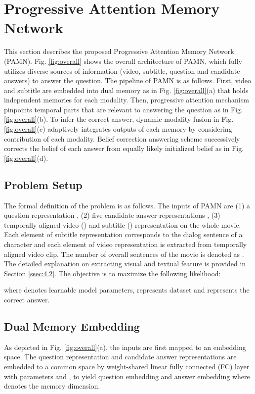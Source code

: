 \documentclass[10pt,twocolumn,letterpaper]{article}
\begin{document}
\section{Progressive Attention Memory Network}
\label{sec:3}

This section describes the proposed Progressive Attention Memory Network (PAMN). Fig. \ref{fig:overall} shows the overall architecture of PAMN,  which fully utilizes diverse sources of information (video, subtitle, question and candidate answers) to answer the question. The pipeline of PAMN is as follows. First, video and subtitle are embedded into dual memory as in Fig. \ref{fig:overall}(a) that holds independent memories for each modality. Then, progressive attention mechanism pinpoints temporal parts that are relevant to answering the question as in Fig. \ref{fig:overall}(b). To infer the correct answer, dynamic modality fusion in Fig. \ref{fig:overall}(c) adaptively integrates outputs of each memory by considering contribution of each modality. Belief correction answering scheme successively corrects the belief of each answer from equally likely initialized belief as in Fig. \ref{fig:overall}(d).


\subsection{Problem Setup}
\label{ssec:3.1}
The formal definition of the problem is as follows. The inputs of PAMN are (1) a question representation , (2) five candidate answer representations , (3) temporally aligned video () and subtitle () representation  on the whole movie. Each element of subtitle representation  corresponds to the dialog sentence of a character and each element of video representation  is extracted from temporally aligned video clip. The number of overall sentences of the movie is denoted as . The detailed explanation on extracting visual and textual feature is provided in Section \ref{ssec:4.2}. The objective is to maximize the following likelihood:

where  denotes learnable model parameters,  represents dataset and  represents the correct answer.


\subsection{Dual Memory Embedding}
\label{ssec:3.2}
As depicted in Fig. \ref{fig:overall}(a), the inputs are first mapped to an embedding space. The question representation  and candidate answer representations  are embedded to a common space by weight-shared linear fully connected (FC) layer with parameters  and , to yield question embedding  and answer embedding  where  denotes the memory dimension.
\end{document}
